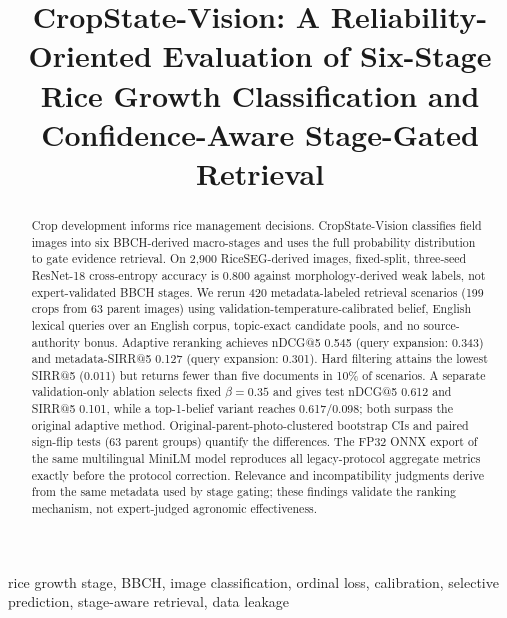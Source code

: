 \documentclass[conference,a4paper]{IEEEtran}
\begin{document}
\title{CropState-Vision: A Reliability-Oriented Evaluation of Six-Stage Rice Growth
Classification and Confidence-Aware Stage-Gated Retrieval}

\author{
}

\maketitle

\begin{abstract}
Crop development informs rice management decisions. CropState-Vision classifies field images into six BBCH-derived macro-stages and uses the full probability distribution to gate evidence retrieval. On 2{,}900 RiceSEG-derived images, fixed-split, three-seed ResNet-18 cross-entropy accuracy is 0.800 against morphology-derived weak labels, not expert-validated BBCH stages. We rerun 420 metadata-labeled retrieval scenarios (199 crops from 63 parent images) using validation-temperature-calibrated belief, English lexical queries over an English corpus, topic-exact candidate pools, and no source-authority bonus. Adaptive reranking achieves nDCG@5 0.545 (query expansion: 0.343) and metadata-SIRR@5 0.127 (query expansion: 0.301). Hard filtering attains the lowest SIRR@5 (0.011) but returns fewer than five documents in 10\% of scenarios. A separate validation-only ablation selects fixed $\beta=0.35$ and gives test nDCG@5 0.612 and SIRR@5 0.101, while a top-1-belief variant reaches 0.617/0.098; both surpass the original adaptive method. Original-parent-photo-clustered bootstrap CIs and paired sign-flip tests (63 parent groups) quantify the differences. The FP32 ONNX export of the same multilingual MiniLM model reproduces all legacy-protocol aggregate metrics exactly before the protocol correction. Relevance and incompatibility judgments derive from the same metadata used by stage gating; these findings validate the ranking mechanism, not expert-judged agronomic effectiveness.

\end{abstract}

\begin{IEEEkeywords}
rice growth stage, BBCH, image classification, ordinal loss, calibration,
selective prediction, stage-aware retrieval, data leakage
\end{IEEEkeywords}
\end{document}
